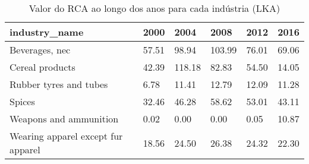 \begin{table}
\centering
\caption{Valor do RCA ao longo dos anos para cada indústria (LKA)}
\begin{tabular}{p{6cm}p{1.5cm}p{1.5cm}p{1.5cm}p{1.5cm}p{1.5cm}}
\toprule
                     industry\_name &  2000 &   2004 &   2008 &  2012 &  2016 \\
\midrule
                    Beverages, nec & 57.51 &  98.94 & 103.99 & 76.01 & 69.06 \\
                   Cereal products & 42.39 & 118.18 &  82.83 & 54.50 & 14.05 \\
            Rubber tyres and tubes &  6.78 &  11.41 &  12.79 & 12.09 & 11.28 \\
                            Spices & 32.46 &  46.28 &  58.62 & 53.01 & 43.11 \\
            Weapons and ammunition &  0.02 &   0.00 &   0.00 &  0.05 & 10.87 \\
Wearing apparel except fur apparel & 18.56 &  24.50 &  26.38 & 24.32 & 22.30 \\
\bottomrule
\end{tabular}
\end{table}

